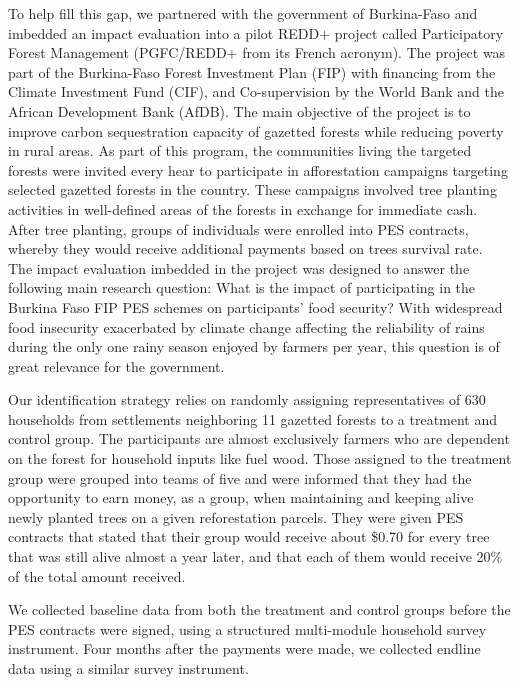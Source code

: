 \documentclass[preprint,12pt]{elsarticle}
\begin{document}
To help fill this gap, we partnered with the government of Burkina-Faso and imbedded an impact evaluation into a pilot REDD+ project called Participatory Forest Management (PGFC/REDD+ from its French acronym). The project was part of the Burkina-Faso Forest Investment Plan (FIP) with financing from the Climate Investment Fund (CIF), and Co-supervision by the World Bank and the African Development Bank (AfDB).  The main objective of the project is to improve carbon sequestration capacity of gazetted forests while reducing poverty in rural areas. As part of this program, the communities living the targeted forests were invited every hear to participate in afforestation campaigns targeting selected gazetted forests in the country. These campaigns involved tree planting activities in well-defined areas of the forests in exchange for immediate cash. After tree planting, groups of individuals were enrolled into PES contracts, whereby they would receive additional payments based on trees survival rate. \\

The impact evaluation imbedded in the project was designed to answer the following main research question: What is the impact of participating in the Burkina Faso FIP PES schemes on participants’ food security?  With widespread food insecurity exacerbated by climate change affecting the reliability of rains during the only one rainy season enjoyed by farmers per year, this question is of great relevance for the government.  
\par
Our identification strategy relies on randomly assigning representatives of 630 households from settlements neighboring 11 gazetted forests to a treatment and control group. The participants are almost exclusively farmers who are dependent on the forest for household inputs like fuel wood. Those assigned to the treatment group were grouped into teams of five and were informed that they had the opportunity to earn money, as a group, when maintaining and keeping alive newly planted trees on a given reforestation parcels. They were given PES contracts that stated that their group would receive about \$0.70 for every tree that was still alive almost a year later, and that each of them would receive 20\% of the total amount received. 
\par 
We collected baseline data from both the treatment and control groups before the PES contracts were signed, using a structured multi-module household survey instrument.  Four months after the payments were made, we collected endline data using a similar survey instrument.
\\
\end{document}

